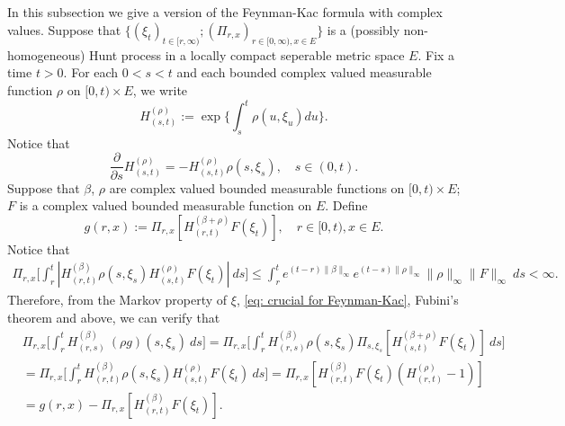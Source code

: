 \documentclass[12pt, a4paper]{amsart}
\theoremstyle{definition}
\numberwithin{equation}{section}
\begin{document}
\subsection{}
\label{seq: complex Feynman-Kac transform}
    In this subsection we give a version of the Feynman-Kac formula with complex values.
	Suppose that $\{(\xi_t)_{t \in [r,\infty)}; (\Pi_{r,x})_{r\in [0,\infty), x\in E}\}$ is a (possibly non-homogeneous) Hunt process in a locally compact seperable metric space $E$.
    Fix a time $t >0$.
    For each $0< s< t$ and each bounded complex valued measurable function $\rho$ on $[0,t) \times E$, we write
\begin{equation}
	H^{(\rho)}_{(s,t)}:= \exp\Big\{\int_s^t \rho(u,\xi_u) du\Big\}.
\end{equation}
	Notice that
\begin{equation}
\label{eq: crucial for Feynman-Kac}
	\frac{\partial}{\partial s} H^{(\rho)}_{(s,t)}= -H^{(\rho)}_{(s,t)}\rho(s,\xi_s),
    \quad s\in (0,t).
\end{equation}
    Suppose that $\beta$, $\rho$ are complex valued bounded measurable functions on $[0,t) \times E$; $F$ is a complex valued bounded measurable function on $E$.
	Define
\begin{equation}
	g(r,x) := \Pi_{r,x}[ H_{(r,t)}^{(\beta+\rho)} F(\xi_t)],\quad r \in [0,t), x\in E.
\end{equation}
    Notice that
\begin{align}
    \Pi_{r,x} \Big[ \int_r^t | H_{(r,t)}^{(\beta)}\rho(s,\xi_s) H_{(s,t)}^{(\rho)} F(\xi_t)| ~ds \Big]
    \leq  \int_r^t e^{(t-r)\|\beta\|_\infty}e^{(t-s)\|\rho\|_\infty}\|\rho\|_\infty\|F\|_\infty ~ds
    < \infty.
\end{align}
	Therefore, from the Markov property of $\xi$, \eqref{eq: crucial for Feynman-Kac}, Fubini's theorem and above, we can verify that
\begin{align}
	&\Pi_{r,x} \Big[ \int_r^tH_{(r,s)}^{(\beta)}~(\rho g)(s,\xi_s)~ds \Big]
	=\Pi_{r,x} \Big[ \int_r^t H_{(r,s)}^{(\beta)}\rho(s,\xi_s) \Pi_{s,\xi_s}[ H_{(s,t)}^{(\beta+\rho)} F(\xi_t)]~ds \Big]
	\\&= \Pi_{r,x} \Big[ \int_r^t H_{(r,t)}^{(\beta)}\rho(s,\xi_s) H_{(s,t)}^{(\rho)} F(\xi_t) ~ds \Big]
	= \Pi_{r,x} [ H_{(r,t)}^{(\beta)}F(\xi_t)(H_{(r,t)}^{(\rho)} - 1)]
	\\&= g(r,x) - \Pi_{r,x} [ H_{(r,t)}^{(\beta)} F(\xi_t)].
\end{align}
\end{document}
